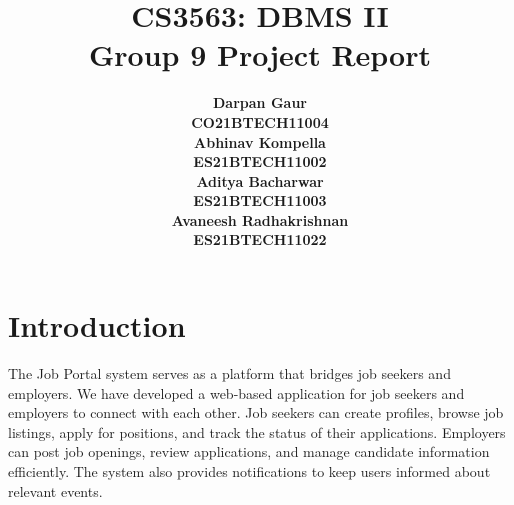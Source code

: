 \documentclass[12pt]{article}
\title{
    \textbf{CS3563: DBMS II} \\ 
    \textbf{Group 9 Project Report} \\
}
\author{
    \small
    \begin{tabular}{c}
        \textbf{Darpan Gaur} \\
        \textbf{CO21BTECH11004}
    \end{tabular}
    \begin{tabular}{c}
        \textbf{Abhinav Kompella} \\
        \textbf{ES21BTECH11002}
    \end{tabular}
    \begin{tabular}{c}
        \textbf{Aditya Bacharwar} \\
        \textbf{ES21BTECH11003}
    \end{tabular}
    \begin{tabular}{c}
        \textbf{Avaneesh Radhakrishnan} \\
        \textbf{ES21BTECH11022}
    \end{tabular}
}
\date{}
\begin{document}
\maketitle

\hrulefill

\section*{Introduction}
The Job Portal system serves as a platform that bridges job seekers and employers. We have developed a web-based application for job seekers and employers to connect with each other. Job seekers can create profiles, browse job listings, apply for positions, and track the status of their applications. Employers can post job openings, review applications, and manage candidate information efficiently. The system also provides notifications to keep users informed about relevant events.
\end{document}
